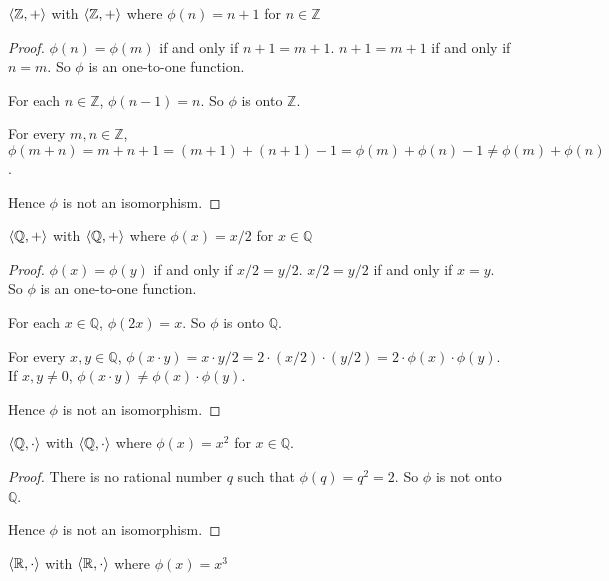 \begin{exercise}
    $\left\langle{\mathbb{Z}, +}\right\rangle$ with $\left\langle{\mathbb{Z}, +}\right\rangle$ where $\phi(n) = n + 1$ for $n\in\mathbb{Z}$
\end{exercise}

\begin{proof}
    $\phi(n) = \phi(m)$ if and only if $n + 1 = m + 1$. $n + 1 = m + 1$ if and only if $n = m$. So $\phi$ is an one-to-one function.

    For each $n\in\mathbb{Z}$, $\phi(n - 1) = n$. So $\phi$ is onto $\mathbb{Z}$.

    For every $m, n\in\mathbb{Z}$, $\phi(m + n) = m + n + 1 = (m + 1) + (n + 1) - 1 = \phi(m) + \phi(n) - 1 \ne \phi(m) + \phi(n)$.

    Hence $\phi$ is not an isomorphism.
\end{proof}

\begin{exercise}
    $\left\langle{\mathbb{Q}, +}\right\rangle$ with $\left\langle{\mathbb{Q}, +}\right\rangle$ where $\phi(x) = x/2$ for $x\in\mathbb{Q}$
\end{exercise}

\begin{proof}
    $\phi(x) = \phi(y)$ if and only if $x/2 = y/2$. $x/2 = y/2$ if and only if $x = y$. So $\phi$ is an one-to-one function.

    For each $x\in\mathbb{Q}$, $\phi(2x) = x$. So $\phi$ is onto $\mathbb{Q}$.

    For every $x, y\in\mathbb{Q}$, $\phi(x\cdot y) = x\cdot y/2 = 2\cdot(x/2)\cdot(y/2) = 2\cdot\phi(x)\cdot\phi(y)$. If $x, y\ne 0$, $\phi(x\cdot y) \ne \phi(x)\cdot\phi(y)$.

    Hence $\phi$ is not an isomorphism.
\end{proof}

\begin{exercise}
    $\left\langle{\mathbb{Q},\cdot}\right\rangle$ with $\left\langle{\mathbb{Q},\cdot}\right\rangle$ where $\phi(x) = x^{2}$ for $x\in\mathbb{Q}$.
\end{exercise}

\begin{proof}
    There is no rational number $q$ such that $\phi(q) = q^{2} = 2$. So $\phi$ is not onto $\mathbb{Q}$.

    Hence $\phi$ is not an isomorphism.
\end{proof}

\begin{exercise}
    $\left\langle{\mathbb{R},\cdot}\right\rangle$ with $\left\langle{\mathbb{R},\cdot}\right\rangle$ where $\phi(x) = x^{3}$
\end{exercise}

